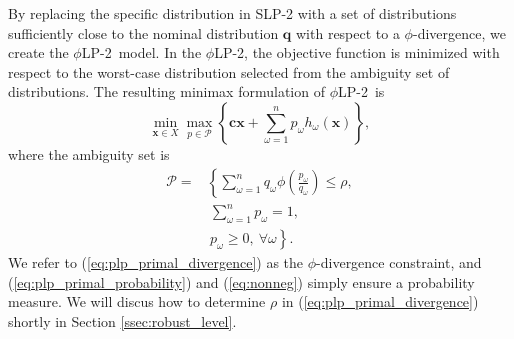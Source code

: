 \documentclass[opre,nonblindrev]{informs3} %
\newcommand{\x}{\mathbf{x}}
\renewcommand{\c}{\mathbf{c}}
\newcommand{\q}{\mathbf{q}}
\newcommand{\plp}{$\phi$LP-2}
\begin{document}
By replacing the specific distribution in SLP-2 with a set of distributions sufficiently close to the nominal distribution $\q$ with respect to a $\phi$-divergence, we create the \plp\ model.
In the \plp, the objective function is minimized with respect to the worst-case distribution selected from the ambiguity set of distributions.
The resulting minimax formulation of \plp\ is
\begin{equation}
	\min_{\x \in X} \max_{p \in \mathcal{P}} \left\{ \c\x + \sum_{\omega=1}^{n} p_\omega h_\omega(\x) \right\}, \label{eq:plp_primal}
\end{equation}
where the ambiguity set is
\begin{align}
	\mathcal{P} = & \left\{ \sum_{\omega = 1}^{n} q_\omega \phi\left(\frac{p_\omega}{q_\omega}\right) \leq \rho, \right. \label{eq:plp_primal_divergence} \\
	& \ \sum_{\omega=1}^{n} p_\omega = 1, \label{eq:plp_primal_probability} \\
	& \ \left. p_\omega \geq 0,\ \forall \omega \right\}. \label{eq:nonneg}
\end{align}
We refer to (\ref{eq:plp_primal_divergence}) as the $\phi$-divergence constraint, and (\ref{eq:plp_primal_probability}) and (\ref{eq:nonneg}) simply ensure a probability measure.
We will discus how to determine $\rho$ in (\ref{eq:plp_primal_divergence}) shortly in Section \ref{ssec:robust_level}.
\end{document}
